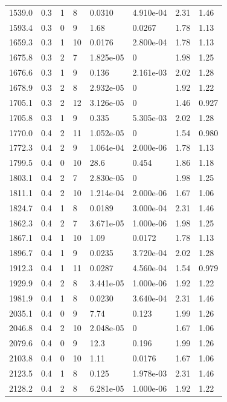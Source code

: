 \documentclass[preview]{standalone}
\begin{document}
{{{\begin{tabular}{L{1.2cm}C{1.2cm} C{0.3cm}C{0.5cm} C{1.4cm}C{1.4cm} C{1.4cm}C{1.4cm}}
  1539.0  &   0.3  & 1     &  8 &  0.0310  & 4.910e-04  & 2.31 &  1.46   \\ 
  1593.4  &   0.3  & 0     &  9 &  1.68  & 0.0267  & 1.78 &  1.13   \\ 
  1659.3  &   0.3  & 1     & 10 &  0.0176  & 2.800e-04  & 1.78 &  1.13   \\ 
  1675.8  &   0.3  & 2     &  7 &  1.825e-05  & 0  & 1.98 &  1.25   \\ 
  1676.6  &   0.3  & 1     &  9 &  0.136  & 2.161e-03  & 2.02 &  1.28   \\ 
  1678.9  &   0.3  & 2     &  8 &  2.932e-05  & 0  & 1.92 &  1.22   \\ 
  1705.1  &   0.3  & 2     & 12 &  3.126e-05  & 0  & 1.46 &  0.927   \\ 
  1705.8  &   0.3  & 1     &  9 &  0.335  & 5.305e-03  & 2.02 &  1.28   \\ 
  1770.0  &   0.4  & 2     & 11 &  1.052e-05  & 0  & 1.54 &  0.980   \\ 
  1772.3  &   0.4  & 2     &  9 &  1.064e-04  & 2.000e-06  & 1.78 &  1.13   \\ 
  1799.5  &   0.4  & 0     & 10 &  28.6  & 0.454  & 1.86 &  1.18   \\ 
  1803.1  &   0.4  & 2     &  7 &  2.830e-05  & 0  & 1.98 &  1.25   \\ 
  1811.1  &   0.4  & 2     & 10 &  1.214e-04  & 2.000e-06  & 1.67 &  1.06   \\ 
  1824.7  &   0.4  & 1     &  8 &  0.0189  & 3.000e-04  & 2.31 &  1.46   \\ 
  1862.3  &   0.4  & 2     &  7 &  3.671e-05  & 1.000e-06  & 1.98 &  1.25   \\ 
  1867.1  &   0.4  & 1     & 10 &  1.09  & 0.0172  & 1.78 &  1.13   \\ 
  1896.7  &   0.4  & 1     &  9 &  0.0235  & 3.720e-04  & 2.02 &  1.28   \\ 
  1912.3  &   0.4  & 1     & 11 &  0.0287  & 4.560e-04  & 1.54 &  0.979   \\ 
  1929.9  &   0.4  & 2     &  8 &  3.441e-05  & 1.000e-06  & 1.92 &  1.22   \\ 
  1981.9  &   0.4  & 1     &  8 &  0.0230  & 3.640e-04  & 2.31 &  1.46   \\ 
  2035.1  &   0.4  & 0     &  9 &  7.74  & 0.123  & 1.99 &  1.26   \\ 
  2046.8  &   0.4  & 2     & 10 &  2.048e-05  & 0  & 1.67 &  1.06   \\ 
  2079.6  &   0.4  & 0     &  9 &  12.3  & 0.196  & 1.99 &  1.26   \\ 
  2103.8  &   0.4  & 0     & 10 &  1.11  & 0.0176  & 1.67 &  1.06   \\ 
  2123.5  &   0.4  & 1     &  8 &  0.125  & 1.978e-03  & 2.31 &  1.46   \\ 
  2128.2  &   0.4  & 2     &  8 &  6.281e-05  & 1.000e-06  & 1.92 &  1.22   \\ 
\hline 
\end{tabular} 

}}}
\end{document}
